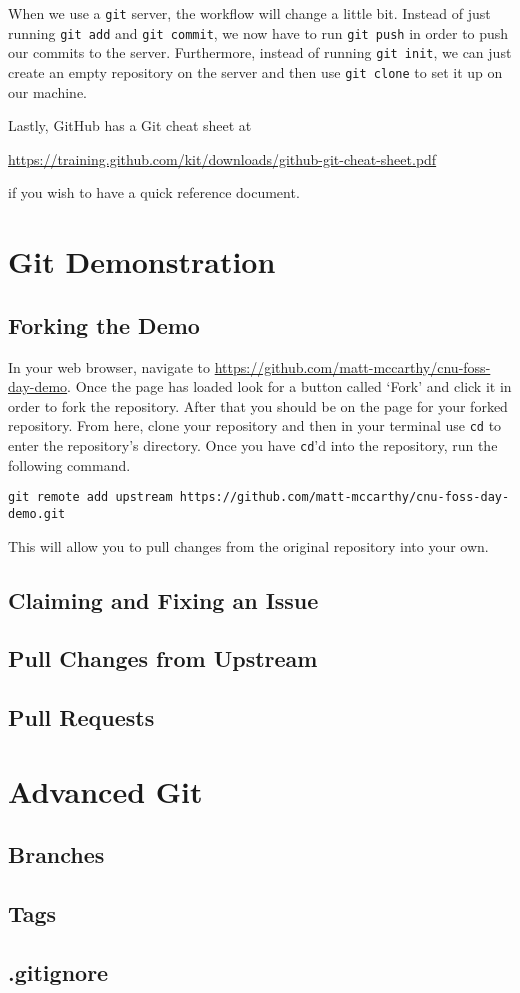 \documentclass[notitlepage]{simple}
\begin{document}
When we use a \verb|git| server, the workflow will change a little bit.
Instead of just running \verb|git add| and \verb|git commit|, we now have to run \verb|git push| in order to push our commits to the server.
Furthermore, instead of running \verb|git init|, we can just create an empty repository on the server and then use \verb|git clone| to set it up on our machine.

Lastly, GitHub has a Git cheat sheet at
\begin{center}
\url{https://training.github.com/kit/downloads/github-git-cheat-sheet.pdf}
\end{center}
if you wish to have a quick reference document.

\section{Git Demonstration}

\subsection{Forking the Demo}

In your web browser, navigate to \url{https://github.com/matt-mccarthy/cnu-foss-day-demo}.
Once the page has loaded look for a button called `Fork' and click it in order to fork the repository.
After that you should be on the page for your forked repository.
From here, clone your repository and then in your terminal use \verb|cd| to enter the repository's directory.
Once you have \verb|cd|'d into the repository, run the following command.
\begin{center}
\verb|git remote add upstream https://github.com/matt-mccarthy/cnu-foss-day-demo.git|
\end{center}
This will allow you to pull changes from the original repository into your own.

\subsection{Claiming and Fixing an Issue}

\subsection{Pull Changes from Upstream}

\subsection{Pull Requests}


\section{Advanced Git}

\subsection{Branches}

\subsection{Tags}

\subsection{.gitignore}
\end{document}

